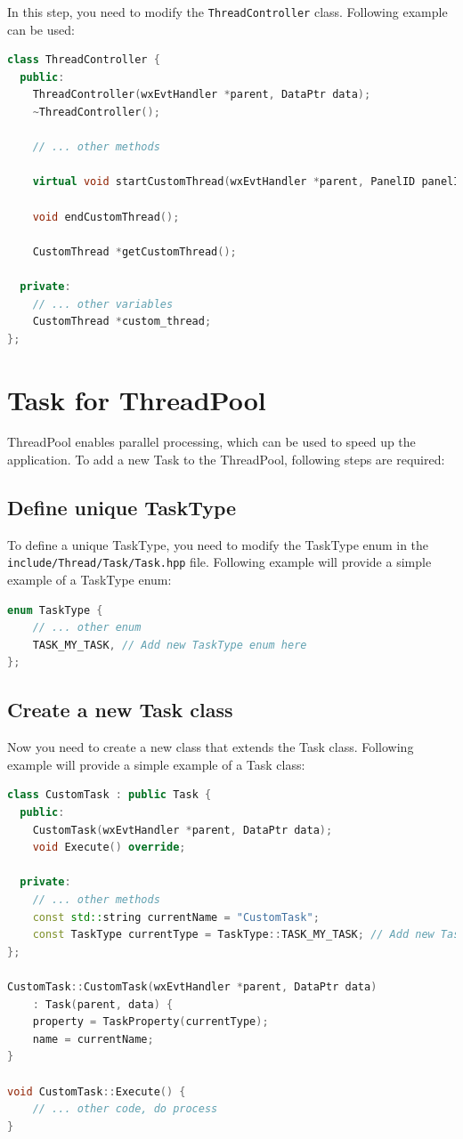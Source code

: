 In this step, you need to modify the \texttt{ThreadController} class. Following example can be used:

\begin{lstlisting}[language=C++, caption={ThreadController class example}]
class ThreadController {
  public:
    ThreadController(wxEvtHandler *parent, DataPtr data);
    ~ThreadController();

    // ... other methods

    virtual void startCustomThread(wxEvtHandler *parent, PanelID panelID);

    void endCustomThread();

    CustomThread *getCustomThread();

  private:
    // ... other variables 
    CustomThread *custom_thread;
};
\end{lstlisting}

\chapter{Task for ThreadPool}

ThreadPool enables parallel processing, which can be used to speed up the application. To add a new Task to the ThreadPool, following steps are required:

\section{Define unique TaskType}

To define a unique TaskType, you need to modify the TaskType enum in the \texttt{include/Thread/Task/Task.hpp} file. Following example will provide a simple example of a TaskType enum:

\begin{lstlisting}[language=C++, caption={TaskType enum example}]
enum TaskType {
    // ... other enum
    TASK_MY_TASK, // Add new TaskType enum here
};
\end{lstlisting}

\section{Create a new Task class}

Now you need to create a new class that extends the Task class. Following example will provide a simple example of a Task class:

\begin{lstlisting}[language=C++, caption={CustomTask class example}]
class CustomTask : public Task {
  public:
    CustomTask(wxEvtHandler *parent, DataPtr data);
    void Execute() override;

  private:
    // ... other methods
    const std::string currentName = "CustomTask";
    const TaskType currentType = TaskType::TASK_MY_TASK; // Add new TaskType enum here
};

CustomTask::CustomTask(wxEvtHandler *parent, DataPtr data)
    : Task(parent, data) {
    property = TaskProperty(currentType);
    name = currentName;
}

void CustomTask::Execute() {
    // ... other code, do process
}
\end{lstlisting}


